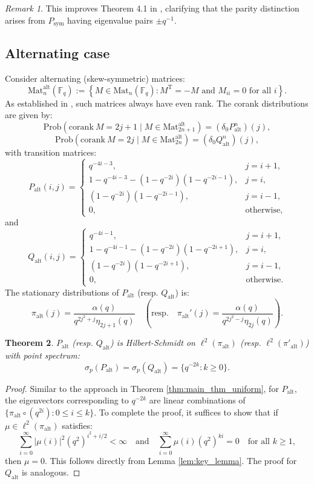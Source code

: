 \documentclass[a4]{amsart}
\newcommand{\Prob}{{\mathrm{Prob}}}
\newcommand{\Mat}{{\mathrm{Mat}}}
\newcommand{\alt}{{\mathrm{alt}}}
\newcommand{\corank}{\mathrm{corank~}}
\newcommand{\sym}{\mathrm{sym}}
\newcommand{\T}{\mathrm{T}}
\newtheorem{theorem}{Theorem}
\theoremstyle{remark} \newtheorem{remark}[theorem]{Remark}
\begin{document}
\begin{remark}\label{rmk:explainFG15}
This improves Theorem 4.1 in \cite{fulman2015Steins}, clarifying that the parity distinction arises from $P_\sym$ having eigenvalue pairs $\pm q^{-1}$.
\end{remark}



\medskip
\subsection{Alternating case}
Consider alternating (skew-symmetric) matrices:
\[
\Mat_n^\alt(\mathbb{F}_q) := \left\{M \in \Mat_n(\mathbb{F}_q) : M^\T = -M \text{ and } M_{ii} = 0 \text{ for all } i\right\}.
\]
As established in \cite{fulman2015Steins, gerthiii1986Limit}, such matrices always have even rank. The corank distributions are given by:
\[
\Prob(\corank M = 2j+1 \mid M \in \Mat_{2n+1}^\alt) = (\delta_0 P_\alt^n)(j),
\]
\[
\Prob(\corank M = 2j \mid M \in \Mat_{2n}^\alt) = (\delta_0 Q_\alt^n)(j),
\]
with transition matrices:
\[
P_\alt(i,j) = 
\begin{cases}
q^{-4i-3}, & j = i+1, \\
1 - q^{-4i-3} - (1-q^{-2i})(1-q^{-2i-1}), & j = i, \\
(1-q^{-2i})(1-q^{-2i-1}), & j = i-1, \\
0, & \text{otherwise},
\end{cases}
\]
and
\[
Q_\alt(i,j) = 
\begin{cases}
q^{-4i-1}, & j = i+1, \\
1 - q^{-4i-1} - (1-q^{-2i})(1-q^{-2i+1}), & j = i, \\
(1-q^{-2i})(1-q^{-2i+1}), & j = i-1, \\
0, & \text{otherwise}.
\end{cases}
\]
The stationary distributions of $P_\alt$ (resp. $Q_\alt$) is:
\[
\pi_\alt(j) = \frac{\alpha(q)}{q^{2j^2+j}\eta_{2j+1}(q)} \quad \left(\text{resp.}\quad \pi_\alt'(j) = \frac{\alpha(q)}{q^{2j^2-j}\eta_{2j}(q)}\right).
\]

\begin{theorem}
$P_\alt$ (resp. $Q_\alt$) is Hilbert-Schmidt on $\ell^2(\pi_\alt)$ (resp. $\ell^2(\pi'_\alt)$) with point spectrum:
\[
\sigma_p(P_\alt) = \sigma_p(Q_\alt) = \{q^{-2k} : k \geq 0\}.
\]
\end{theorem}

\begin{proof}
Similar to the approach in Theorem \ref{thm:main_thm_uniform}, for $P_\alt$, the eigenvectors corresponding to $q^{-2k}$ are linear combinations of $\{\pi_\alt \circ (q^{2i}) : 0 \leq i \leq k\}$. 
To complete the proof, it suffices to show that if $\mu \in \ell^2(\pi_\alt)$ satisfies:
\[
\sum_{i=0}^\infty |\mu(i)|^2 (q^2)^{i^2 + i/2} < \infty \quad \text{and} \quad \sum_{i=0}^\infty \mu(i)(q^2)^{ki} = 0 \quad \text{for all } k \geq 1,
\]
then $\mu = 0$. This follows directly from Lemma \ref{lem:key_lemma}. The proof for $Q_\alt$ is analogous.
\end{proof}
\end{document}
